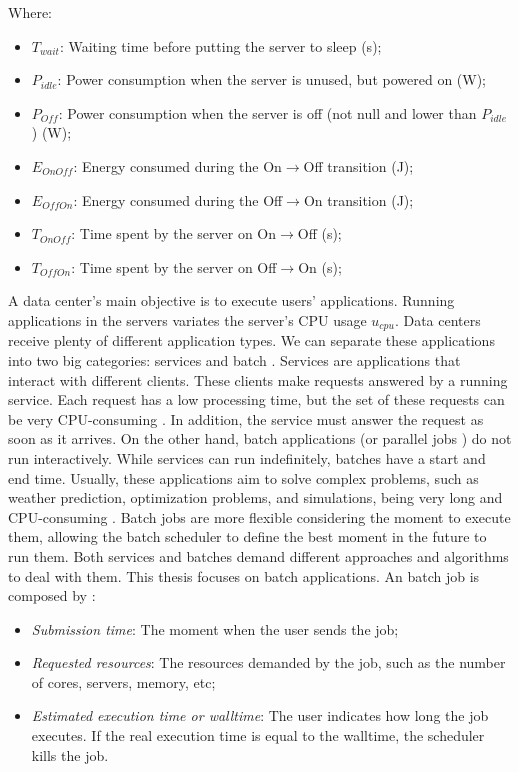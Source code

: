 Where:
\begin{itemize}
    \item $T_{wait}$: Waiting time before putting the server to sleep (s);
    \item $P_{idle}$: Power consumption when the server is unused, but powered on (W);
    \item $P_{Off}$: Power consumption when the server is off (not null and lower than $P_{idle}$) (W);
    \item $E_{OnOff}$: Energy consumed during the On$\rightarrow$Off transition (J);
    \item $E_{OffOn}$: Energy consumed during the Off$\rightarrow$On transition (J);
    \item $T_{OnOff}$: Time spent by the server on On$\rightarrow$Off (s);
    \item $T_{OffOn}$: Time spent by the server on Off$\rightarrow$On (s);
\end{itemize}

A data center's main objective is to execute users' applications. Running applications in the servers variates the server's CPU usage $u_{cpu}$. Data centers receive plenty of different application types. We can separate these applications into two big categories: services and batch \cite{rostirolla2022survey,da2018modeling}. Services are applications that interact with different clients. These clients make requests answered by a running service. Each request has a low processing time, but the set of these requests can be very CPU-consuming \cite{masdari2020survey}. In addition, the service must answer the request as soon as it arrives. On the other hand, batch applications (or parallel jobs \cite{feitelson2014experience}) do not run interactively. While services can run indefinitely, batches have a start and end time. Usually, these applications aim to solve complex problems, such as weather prediction, optimization problems, and simulations, being very long and CPU-consuming \cite{masdari2020survey}. Batch jobs are more flexible considering the moment to execute them, allowing the batch scheduler to define the best moment in the future to run them. Both services and batches demand different approaches and algorithms to deal with them. This thesis focuses on batch applications. An batch job is composed by \cite{rostirolla2022survey, srinivasan2002characterization, takizawa2020effect}:

\begin{itemize}
    \item \textit{Submission time}: The moment when the user sends the job;
    \item \textit{Requested resources}: The resources demanded by the job, such as the number of cores, servers, memory, etc;
    \item \textit{Estimated execution time or walltime}: The user indicates how long the job executes. If the real execution time is equal to the walltime, the scheduler kills the job. 
\end{itemize}

